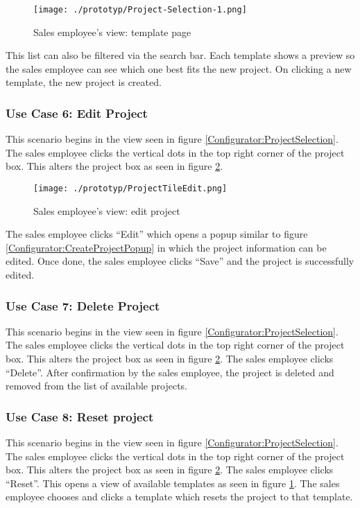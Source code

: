 \begin{figure}[ht]
  \centering
  \texttt{[image: ./prototyp/Project-Selection-1.png]}
  \caption{Sales employee's view: template page}
  \label{Configurator:Template}
\end{figure}

This list can also be filtered via the search bar. Each template shows a preview so the sales employee can see which one best fits the new project. On clicking a new template, the new project is created. %


\subsubsection{Use Case 6: Edit Project}

This scenario begins in the view seen in figure \ref{Configurator:ProjectSelection}. The sales employee clicks the vertical dots in the top right corner of the project box. This alters the project box as seen in figure \ref{Configurator:ProjectTileEdit}.

\begin{figure}[ht]
  \centering
  \texttt{[image: ./prototyp/ProjectTileEdit.png]}
  \caption{Sales employee's view: edit project} %
  \label{Configurator:ProjectTileEdit}
\end{figure}

The sales employee clicks \enquote{Edit} which opens a popup similar to figure \ref{Configurator:CreateProjectPopup} in which the project information can be edited. Once done, the sales employee clicks \enquote{Save} and the project is successfully edited.


\subsubsection{Use Case 7: Delete Project}
This scenario begins in the view seen in figure \ref{Configurator:ProjectSelection}. The sales employee clicks the vertical dots in the top right corner of the project box. This alters the project box as seen in figure \ref{Configurator:ProjectTileEdit}. The sales employee clicks \enquote{Delete}. After confirmation by the sales employee, the project is deleted and removed from the list of available projects.


\subsubsection{Use Case 8: Reset project}
This scenario begins in the view seen in figure \ref{Configurator:ProjectSelection}. The sales employee clicks the vertical dots in the top right corner of the project box. This alters the project box as seen in figure \ref{Configurator:ProjectTileEdit}. The sales employee clicks \enquote{Reset}. This opens a view of available templates as seen in figure \ref{Configurator:Template}. The sales employee chooses and clicks a template which resets the project to that template.


